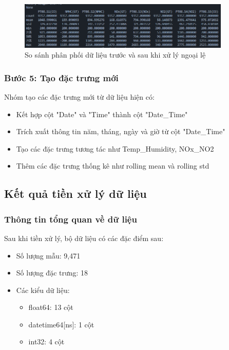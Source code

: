 \begin{figure}[htbp]
    \centering
    \includegraphics[width=0.9\textwidth]{images/data_distribution_comparison.png}
    \vspace{0.5cm}
    \caption{So sánh phân phối dữ liệu trước và sau khi xử lý ngoại lệ}
    \label{fig:data_distribution}
\end{figure}

\subsubsection{Bước 5: Tạo đặc trưng mới}
\hspace{0.5cm}Nhóm tạo các đặc trưng mới từ dữ liệu hiện có:
\begin{itemize}
    \item Kết hợp cột "Date" và "Time" thành cột "Date\_Time"
    \item Trích xuất thông tin năm, tháng, ngày và giờ từ cột "Date\_Time"
    \item Tạo các đặc trưng tương tác như Temp\_Humidity, NOx\_NO2
    \item Thêm các đặc trưng thống kê như rolling mean và rolling std
\end{itemize}

\subsection{Kết quả tiền xử lý dữ liệu}

\subsubsection{Thông tin tổng quan về dữ liệu}
\hspace{0.5cm}Sau khi tiền xử lý, bộ dữ liệu có các đặc điểm sau:
\begin{itemize}
    \item Số lượng mẫu: 9,471
    \item Số lượng đặc trưng: 18
    \item Các kiểu dữ liệu:
    \begin{itemize}
        \item float64: 13 cột
        \item datetime64[ns]: 1 cột
        \item int32: 4 cột
    \end{itemize}
\end{itemize}

